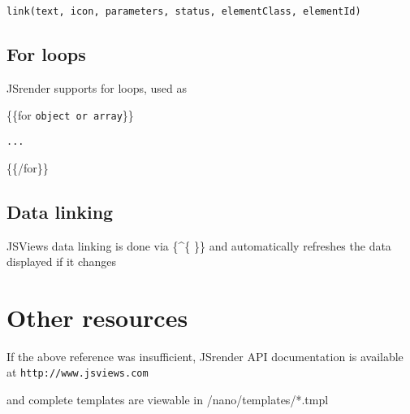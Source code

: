 \documentclass[10pt, a4paper]{article}
\begin{document}
\verb|link(text, icon, parameters, status, elementClass, elementId)|

\subsection{For loops}
JSrender supports for loops, used as

\{\{for \verb|object or array|\}\}

\verb|...|

\{\{/for\}\}

\subsection{Data linking}
JSViews data linking is done via 
\{\textasciicircum\{ \}\}
and automatically refreshes the data displayed if it changes

\section{Other resources}
If the above reference was insufficient, 
JSrender API documentation is available at \verb|http://www.jsviews.com|

and complete templates are viewable in /nano/templates/*.tmpl
\end{document}
